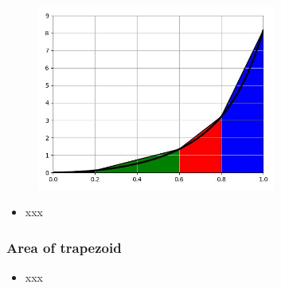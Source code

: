 \documentclass[english,14pt]{beamer}
\begin{document}

\begin{frame}[fragile]

\frametitle{}

\begin{figure}[ht]
	\centering
	\includegraphics[width=0.7\textwidth]{figures/fourPanel}
\end{figure}

\begin{itemize}
	\item xxx
\end{itemize}

\end{frame}


\begin{frame}[fragile]

\frametitle{Area of trapezoid}

\begin{itemize}
	\item xxx
\end{itemize}

\end{frame}

\end{document}
